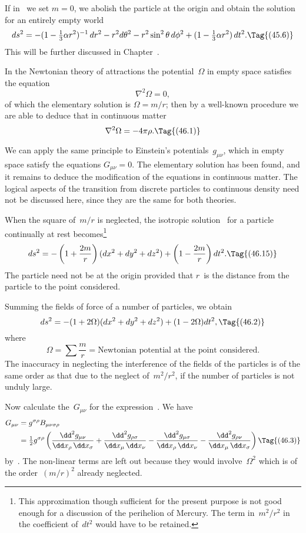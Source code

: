 \documentclass[12pt]{book}
\begin{document}
If in~ we set $m = 0$, we abolish the particle at the origin and obtain
the solution for an entirely empty world
\[
ds^{2} = -(1 - \tfrac{1}{3}\alpha r^{2})^{-1}\, dr^{2}
- r^{2} d\theta^{2} - r^{2} \sin^{2}\theta\, d\phi^{2}
+ (1 - \tfrac{1}{3}\alpha r^{2})\, dt^{2}.
\Tag{(45.6)}
\]
This will be further discussed in Chapter~\@.

%
%

In the Newtonian theory of attractions the potential~$\Omega$ in empty space
satisfies the equation
\[
\nabla^{2}\Omega = 0,
\]
of which the elementary solution is $\Omega = m/r$; then by a well-known procedure
we are able to deduce that in continuous matter
\[
\nabla^{2}\Omega = -4\pi\rho.
\Tag{(46.1)}
\]

We can apply the same principle to Einstein's potentials~$g_{\mu\nu}$, which in
empty space satisfy the equations $G_{\mu\nu} = 0$. The elementary solution has been
found, and it remains to deduce the modification of the equations in continuous
matter. The logical aspects of the transition from discrete particles to continuous
density need not be discussed here, since they are the same for both
theories.

When the square of~$m/r$ is neglected, the isotropic solution~ for a
particle continually at rest becomes\footnote
  {This approximation though sufficient for the present purpose is not good enough for a
  discussion of the perihelion of Mercury. The term in~$m^{2}/r^{2}$ in the coefficient of~$dt^{2}$ would have to
  be retained.}
\[
ds^{2} = -\left(1 + \frac{2m}{r}\right) (dx^{2} + dy^{2} + dz^{2}) + \left(1 - \frac{2m}{r}\right) dt^{2}.
\Tag{(46.15)}
\]
The particle need not be at the origin provided that $r$~is the distance from
the particle to the point considered.

Summing the fields of force of a number of particles, we obtain
\[
ds^{2} = -(1 + 2\Omega) (dx^{2} + dy^{2} + dz^{2}) + (1 - 2\Omega) dt^{2},
\Tag{(46.2)}
\]
where
\[
\Omega = \sum \frac{m}{r}
= \text{Newtonian potential at the point considered.}
\]
The inaccuracy in neglecting the interference of the fields of the particles is
of the same order as that due to the neglect of~$m^{2}/r^{2}$, if the number of particles
is not unduly large.

Now calculate the~$G_{\mu\nu}$ for the expression~. We have
\begin{align*}
  G_{\mu\nu} &= g^{\sigma\rho} B_{\mu\nu\sigma\rho} \\
  &= \tfrac{1}{2}g^{\sigma\rho} \left(
  \frac{\dd^{2} g_{\mu\nu}}{\dd x_{\rho}\, \dd x_{\sigma}}
  + \frac{\dd^{2} g_{\rho\sigma}}{\dd x_{\mu}\, \dd x_{\nu}}
  - \frac{\dd^{2} g_{\mu\sigma}}{\dd x_{\rho}\, \dd x_{\nu}}
  - \frac{\dd^{2} g_{\rho\nu}}{\dd x_{\mu}\, \dd x_{\sigma}}\right)
  \Tag{(46.3)}
\end{align*}
by~. The non-linear terms are left out because they would involve~$\Omega^{2}$
which is of the order~$(m/r)^{2}$ already neglected.
\end{document}
